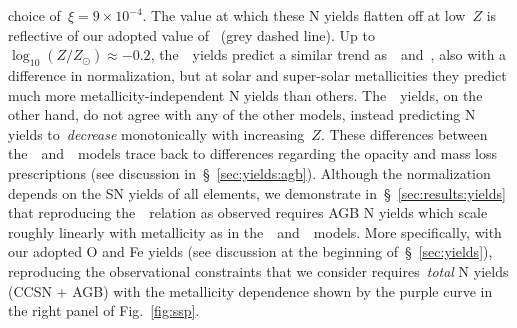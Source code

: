 \documentclass[ms.tex]{subfiles}
\begin{document}
choice of~$\xi = 9\times10^{-4}$.
The value at which these N yields flatten off at low~$Z$ is reflective of our
adopted value of~ (grey dashed line).
Up to~$\log_{10}(Z / Z_\odot) \approx -0.2$, the~\karakas~yields predict a
similar trend as~\cristallo~and~\ventura, also with a difference in
normalization, but at solar and super-solar metallicities they predict much
more metallicity-independent N yields than others.
The~\karakasten~yields, on the other hand, do not agree with any of the other
models, instead predicting N yields to~\textit{decrease} monotonically with
increasing~$Z$.
These differences between the~\karakasten~and~\karakas~models trace back to
differences regarding the opacity and mass loss prescriptions (see discussion
in~\S~\ref{sec:yields:agb}).
Although the normalization depends on the SN yields of all elements, we
demonstrate in~\S~\ref{sec:results:yields} that reproducing the~\ohno~relation
as observed requires AGB N yields which scale roughly linearly with metallicity
as in the~\cristallo~and~\ventura~models.
More specifically, with our adopted O and Fe yields (see discussion at the
beginning of~\S~\ref{sec:yields}), reproducing the observational constraints
that we consider requires~\textit{total} N yields (CCSN + AGB) with the
metallicity dependence shown by the purple curve in the right panel of
Fig.~\ref{fig:ssp}.
\end{document}

